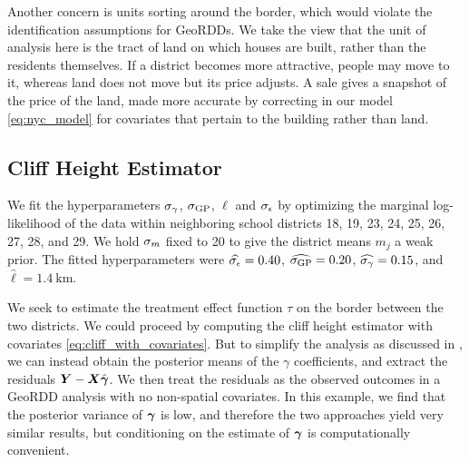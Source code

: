 Another concern is units sorting around the border, which would violate the identification assumptions for GeoRDDs.
We take the view that the unit of analysis here is the tract of land on which houses are built, rather than the residents themselves.
If a district becomes more attractive, people may move to it, whereas land does not move but its price adjusts.
A sale gives a snapshot of the price of the land, made more accurate by correcting in our model \autoref{eq:nyc_model} for covariates that pertain to the building rather than land.



\subsection{Cliff Height Estimator}

We fit the hyperparameters \(\sigma_{\gamma}\), \(\sigma_{\mathrm{GP}}\), \(\ell\) and \(\sigma_{\epsilon}\) by optimizing the marginal log-likelihood of the data within neighboring school districts 18, 19, 23, 24, 25, 26, 27, 28, and 29.
We hold \(\sigma_{m}\) fixed to 20 to give the district means \(m_j\) a weak prior.
The fitted hyperparameters were \(\widehat{\sigma_{\epsilon}}=0.40\), \(\widehat{\sigma_{\mathrm{GP}}}=0.20\), \(\widehat{\sigma_{\gamma}}=0.15\), and \(\widehat{\ell}=1.4~\text{km}\).

We seek to estimate the treatment effect function \(\tau\) on the border between the two districts.
We could proceed by computing the cliff height estimator with covariates \autoref{eq:cliff_with_covariates}.
But to simplify the analysis as discussed in \ofsupp{}, we can instead obtain the posterior means of the \(\gamma\) coefficients, and extract the residuals \(\bm{Y}{}-\bm{X} \hat{\bm{\gamma}}\).
We then treat the residuals as the observed outcomes in a GeoRDD analysis with no non-spatial covariates.
In this example, we find that the posterior variance of \(\bm{\gamma}\) is low, and therefore the two approaches yield very similar results, but conditioning on the estimate of \(\bm{\gamma}\) is computationally convenient.

